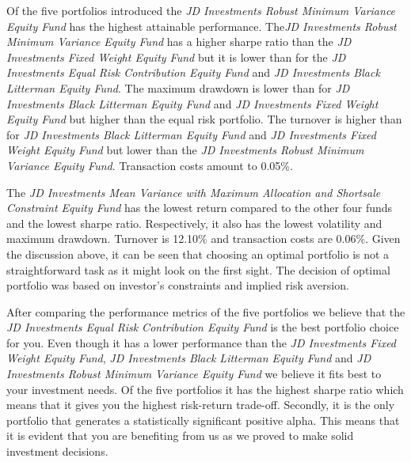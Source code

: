 \documentclass[11pt, parskip=full, DIV=14]{scrreprt}
\begin{document}
Of the five portfolios introduced the \textit{JD Investments Robust Minimum Variance Equity Fund} has the highest attainable performance. The\textit{JD Investments Robust Minimum Variance Equity Fund} has a higher sharpe ratio than the \textit{JD Investments Fixed Weight Equity Fund} but it is lower than for the \textit{JD Investments Equal Risk Contribution Equity Fund} and \textit{JD Investments Black Litterman Equity Fund}. The maximum drawdown is lower than for \textit{JD Investments Black Litterman Equity Fund} and \textit{JD Investments Fixed Weight Equity Fund} but higher than the equal risk portfolio. The turnover is higher than for \textit{JD Investments Black Litterman Equity Fund} and \textit{JD Investments Fixed Weight Equity Fund} but lower than the \textit{JD Investments Robust Minimum Variance Equity Fund}. Transaction costs amount to 0.05\%.

The \textit{JD Investments Mean Variance with Maximum Allocation and Shortsale Constraint Equity Fund} has the lowest return compared to the other four funds and the lowest sharpe ratio. Respectively, it also has the lowest volatility and maximum drawdown. Turnover is 12.10\% and transaction costs are 0.06\%. Given the discussion above, it can be seen that choosing an optimal portfolio is not a straightforward task as it might look on the first sight. The decision of optimal portfolio was based on investor’s constraints and implied risk aversion. 

After comparing the performance metrics of the five portfolios we believe that the \textit{JD Investments Equal Risk Contribution Equity Fund} is the best portfolio choice for you. Even though it has a lower performance than the \textit{JD Investments Fixed Weight Equity Fund}, \textit{JD Investments Black Litterman Equity Fund} and \textit{JD Investments Robust Minimum Variance Equity Fund} we believe it fits best to your investment needs. Of the five portfolios it has the highest sharpe ratio which means that it gives you the highest risk-return trade-off. Secondly, it is the only portfolio that generates a statistically significant positive alpha. This means that it is evident that you are benefiting from us as we proved to make solid investment decisions.
\end{document}

